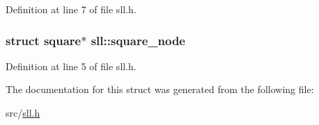 Definition at line 7 of file sll.\-h.

\hypertarget{structsll_a7ddb3d4d62928a1d4eaeb7af3fabf3f5}{
\subsubsection[{square\-\_\-node}]{\setlength{\rightskip}{0pt plus 5cm}struct {\bf square}$\ast$ sll\-::square\-\_\-node}}\label{structsll_a7ddb3d4d62928a1d4eaeb7af3fabf3f5}


Definition at line 5 of file sll.\-h.



The documentation for this struct was generated from the following file\-:\begin{DoxyCompactItemize}
\item 
src/\hyperlink{sll_8h}{sll.\-h}\end{DoxyCompactItemize}
